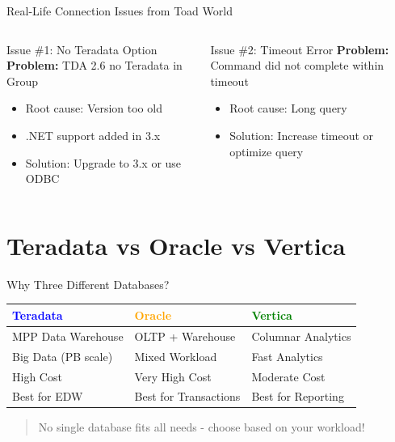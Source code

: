 \documentclass{beamer}
\begin{document}
	\begin{frame}{Real-Life Connection Issues from Toad World}
		\begin{columns}[T]
			\begin{alertblock}{Issue \#1: No Teradata Option}
				\textbf{Problem:} TDA 2.6 no Teradata in Group
				\begin{itemize}
					\item Root cause: Version too old
					\item .NET support added in 3.x
					\item Solution: Upgrade to 3.x or use ODBC
				\end{itemize}
			\end{alertblock}
			
			\begin{alertblock}{Issue \#2: Timeout Error}
				\textbf{Problem:} Command did not complete within timeout
				\begin{itemize}
					\item Root cause: Long query
					\item Solution: Increase timeout or optimize query
				\end{itemize}
			\end{alertblock}
		\end{columns}
	\end{frame}
	
	\section{Teradata vs Oracle vs Vertica}
	
	\begin{frame}{Why Three Different Databases?}
		\begin{center}
			\begin{tabular}{|p{0.3\textwidth}|p{}|p{}|}
				\hline
				\textcolor{blue}{\textbf{Teradata}} & \textcolor{orange}{\textbf{Oracle}} & \textcolor{green}{\textbf{Vertica}} \\
				\hline
				MPP Data Warehouse & OLTP + Warehouse & Columnar Analytics \\
				\hline
				Big Data (PB scale) & Mixed Workload & Fast Analytics \\
				\hline
				High Cost & Very High Cost & Moderate Cost \\
				\hline
				Best for EDW & Best for Transactions & Best for Reporting \\
				\hline
			\end{tabular}
		\end{center}
		\begin{quote}
			No single database fits all needs - choose based on your workload!
		\end{quote}
	\end{frame}
	
\end{document}
